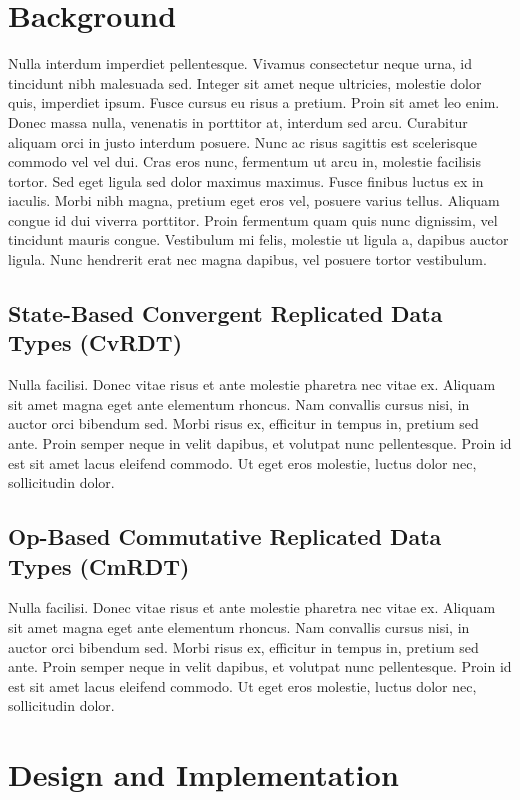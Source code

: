 \documentclass[sigconf,nonacm,11pt]{acmart}
\begin{document}
\section{Background}

Nulla interdum imperdiet pellentesque. Vivamus consectetur neque urna, id tincidunt nibh malesuada sed. Integer sit amet neque ultricies, molestie dolor quis, imperdiet ipsum. Fusce cursus eu risus a pretium. Proin sit amet leo enim. Donec massa nulla, venenatis in porttitor at, interdum sed arcu. Curabitur aliquam orci in justo interdum posuere. Nunc ac risus sagittis est scelerisque commodo vel vel dui. Cras eros nunc, fermentum ut arcu in, molestie facilisis tortor. Sed eget ligula sed dolor maximus maximus. Fusce finibus luctus ex in iaculis. Morbi nibh magna, pretium eget eros vel, posuere varius tellus. Aliquam congue id dui viverra porttitor. Proin fermentum quam quis nunc dignissim, vel tincidunt mauris congue. Vestibulum mi felis, molestie ut ligula a, dapibus auctor ligula. Nunc hendrerit erat nec magna dapibus, vel posuere tortor vestibulum.

\subsection{State-Based Convergent Replicated Data Types (CvRDT)}

Nulla facilisi. Donec vitae risus et ante molestie pharetra nec vitae ex. Aliquam sit amet magna eget ante elementum rhoncus. Nam convallis cursus nisi, in auctor orci bibendum sed. Morbi risus ex, efficitur in tempus in, pretium sed ante. Proin semper neque in velit dapibus, et volutpat nunc pellentesque. Proin id est sit amet lacus eleifend commodo. Ut eget eros molestie, luctus dolor nec, sollicitudin dolor.

\subsection{Op-Based Commutative Replicated Data Types (CmRDT)}

Nulla facilisi. Donec vitae risus et ante molestie pharetra nec vitae ex. Aliquam sit amet magna eget ante elementum rhoncus. Nam convallis cursus nisi, in auctor orci bibendum sed. Morbi risus ex, efficitur in tempus in, pretium sed ante. Proin semper neque in velit dapibus, et volutpat nunc pellentesque. Proin id est sit amet lacus eleifend commodo. Ut eget eros molestie, luctus dolor nec, sollicitudin dolor.

\section{Design and Implementation}
\end{document}
